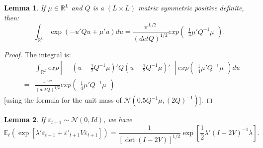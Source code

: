 \documentclass[
  12pt,
]{book}
\newtheorem{lemma}{Lemma}[chapter]
\theoremstyle{definition}
\theoremstyle{definition}
\theoremstyle{definition}
\theoremstyle{definition}
\theoremstyle{remark}
\begin{document}
\begin{lemma}
\protect\hypertarget{lem:integralQuadratic}{}\label{lem:integralQuadratic}If \(\mu \in \mathbb{R}^L\) and \(Q\) is a \((L \times L)\) matrix symmetric positive definite, then:
\[
 \int_{\mathbb{R}^{L}} \exp(-u'Q u + \mu'u)du =
 \frac{\pi^{L/2}}{(det   Q)^{1/2}} exp \left(
\begin{array}{l}  \frac{1}{4} \mu'Q^{-1}\mu \end{array} \right).
\]
\end{lemma}

\begin{proof}
The integral is:
\begin{eqnarray*}
&& \int_{\mathbb{R}^{L}} exp \left[ \begin{array}{l} - (u -
 \frac{1}{2}  Q^{-1} \mu)'  Q (u -
\frac{1}{2} Q^{-1} \mu)'
\end{array}
\right] exp\left(
\begin{array}{l}  \frac{1}{4} \mu'Q^{-1}\mu \end{array}
\right)du \\
&=&  \frac{\pi^{L/2}}{(det Q)^{1/2}} exp\left(
\begin{array}{l}  \frac{1}{4} \mu'Q^{-1}\mu \end{array}
\right)
\end{eqnarray*}
{[}using the formula for the unit mass of \(\mathcal{N}( 0.5Q^{-1}\mu,(2Q)^{-1})\){]}.
\end{proof}

\begin{lemma}
\protect\hypertarget{lem:Quadr}{}\label{lem:Quadr}If \(\varepsilon_{t+1} \sim \mathcal{N}(0,Id)\), we have
\[
\mathbb{E}_t \left(\exp[\lambda'\varepsilon_{t+1}+\varepsilon'_{t+1} V \varepsilon_{t+1}]\right) =  \frac{1}{[\det(I-2V)]^{1/2}} \exp\left[
 \frac{1}{2} \lambda'(I-2V)^{-1}\lambda
\right].
\]
\end{lemma}
\end{document}
